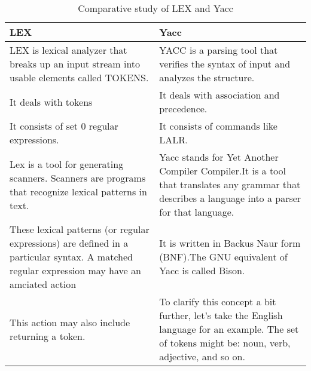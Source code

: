 \documentclass[paper=letter, fontsize=12pt]{article}
\begin{document}
\renewcommand\arraystretch{2}
\begin{longtable}{p{7cm} | p{7cm}}
	\caption{Comparative study of LEX and Yacc}
	\\
	\textbf{LEX} & \textbf{Yacc}
	\\ \hline
	LEX is lexical analyzer that breaks up an input  stream into usable elements called TOKENS.
	& YACC is a parsing tool that verifies the syntax of input and analyzes the structure.
	\\ \hline
	It deals with tokens
	& It deals with association and precedence.
	\\ \hline
	It consists of set 0 regular expressions.
	& It consists of commands like LALR.
	\\ \hline
	
	Lex is a tool for generating scanners. Scanners are programs that recognize lexical patterns in text.
	& Yacc stands for Yet Another Compiler Compiler.It is a tool that translates any grammar that describes a language into a parser for that language. 
	
	\\ \hline
	
	These lexical patterns (or regular expressions) are defined in a particular syntax. A matched regular expression may have an amciated action
	& It is written in Backus Naur form (BNF).The GNU equivalent of Yacc is called Bison. 
	
	\\ \hline
	
	This action may also include returning a token. 
	& 
	To clarify this concept a bit further, let's take the English language for an example. The set of tokens might be: noun, verb, adjective, and so on. 
	
	\\ \hline
\end{longtable}
\end{document}
